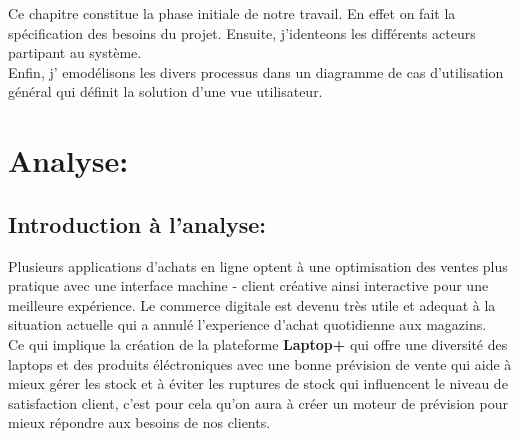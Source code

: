 \documentclass[a4paper]{report}
\begin{document}
\begin{doublespace}
    \renewcommand{\headrulewidth}{1pt}
    \fancyhead[L]{\hspace*{5cm}}
    \begin{doublespace}

        Ce chapitre constitue la phase initiale de notre travail. En effet on fait la spécification des besoins du projet. Ensuite, j'identeons les différents acteurs partipant au système.\\Enfin, j'     emodélisons les divers processus dans un diagramme de cas d’utilisation général qui définit la solution d'une vue utilisateur.
        \section{Analyse:}
        \subsection{Introduction à l'analyse:}
        Plusieurs applications d'achats en ligne optent à une optimisation des ventes plus pratique avec une interface machine - client créative ainsi interactive pour une meilleure expérience. Le commerce digitale est devenu très utile et adequat à la situation actuelle qui a annulé l'experience d'achat quotidienne aux magazins.\\ Ce qui implique la création de la plateforme \textbf{Laptop+} qui offre une diversité des laptops et des produits éléctroniques avec une bonne prévision de vente qui  aide à mieux gérer les stock et à éviter les ruptures de stock qui influencent le niveau de satisfaction client, c'est pour cela qu'on aura à créer un moteur de prévision pour mieux répondre aux besoins de nos  clients.

\end{doublespace}
\end{doublespace}
\end{document}
